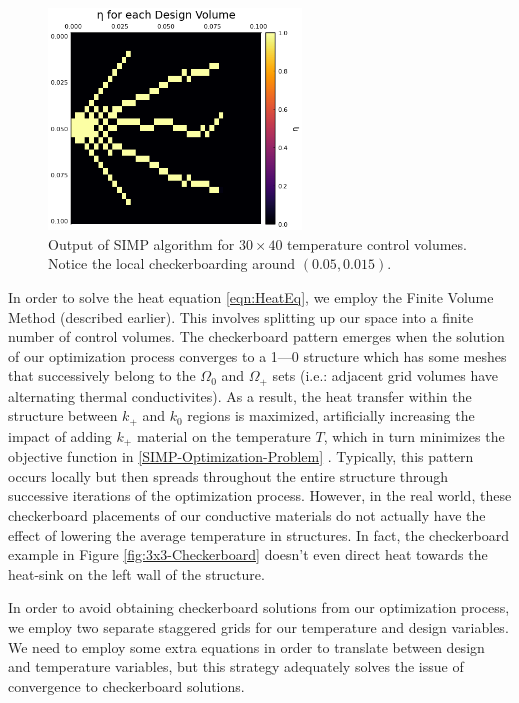 \begin{figure}
	\centering
	\includegraphics[width=0.6\textwidth]{Chapter_II_SIMP_Optimization/Images/SIMP-Example-Checkerboarding.png}
	\caption[Checkerboard Result in Practice]{Output of SIMP algorithm for $30\times 40$ temperature control volumes. Notice the local checkerboarding around $(0.05,0.015)$.}
	\label{fig:SIMP-Checkerboard}
\end{figure}

In order to solve the heat equation \eqref{eqn:HeatEq}, we employ the Finite Volume Method (described earlier). This involves splitting up our space into a finite number of control volumes. The checkerboard pattern emerges when the solution of our optimization process converges to a 1---0 structure which has some meshes that successively belong to the $\Omega_0$ and $\Omega_+$ sets (i.e.: adjacent grid volumes have alternating thermal conductivites). As a result, the heat transfer within the structure between $k_+$ and $k_0$ regions is maximized, artificially increasing the impact of adding $k_+$ material on the temperature $T$, which in turn minimizes the objective function in \eqref{SIMP-Optimization-Problem} \cite[]{Versteeg2007}. Typically, this pattern occurs locally but then spreads throughout the entire structure through successive iterations of the optimization process. However, in the real world, these checkerboard placements of our conductive materials do not actually have the effect of lowering the average temperature in structures. In fact, the checkerboard example in Figure \ref{fig:3x3-Checkerboard} doesn't even direct heat towards the heat-sink on the left wall of the structure.

In order to avoid obtaining checkerboard solutions from our optimization process, we employ two separate staggered grids for our temperature and design variables. We need to employ some extra equations in order to translate between design and temperature variables, but this strategy adequately solves the issue of convergence to checkerboard solutions.

